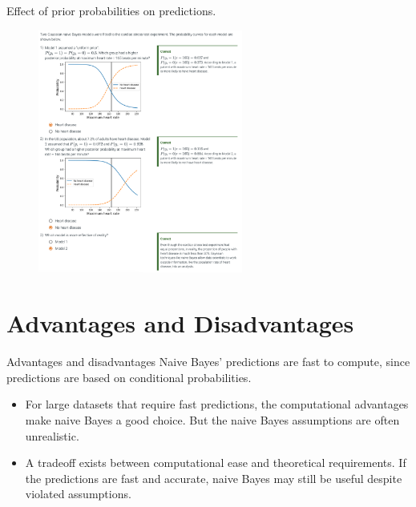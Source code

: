 \documentclass[10pt,dvipsnames]{beamer}
\begin{document}
\begin{frame}{Effect of prior probabilities on predictions.}
	\begin{figure}[ht]
		\centering
		\includegraphics[width=0.6\textwidth]{imgs/nb_27.png}
	\end{figure}
\end{frame}

\section{Advantages and Disadvantages}
\begin{frame}{Advantages and disadvantages}
	Naive Bayes' predictions are fast to compute, since predictions are based on conditional probabilities. 
	\begin{itemize}
		\item For large datasets that require fast predictions, the computational advantages make naive Bayes a good choice. But the naive Bayes assumptions are often unrealistic.
		\item A tradeoff exists between computational ease and theoretical requirements. If the predictions are fast and accurate, naive Bayes may still be useful despite violated assumptions.
	\end{itemize}
\end{frame}
\end{document}
